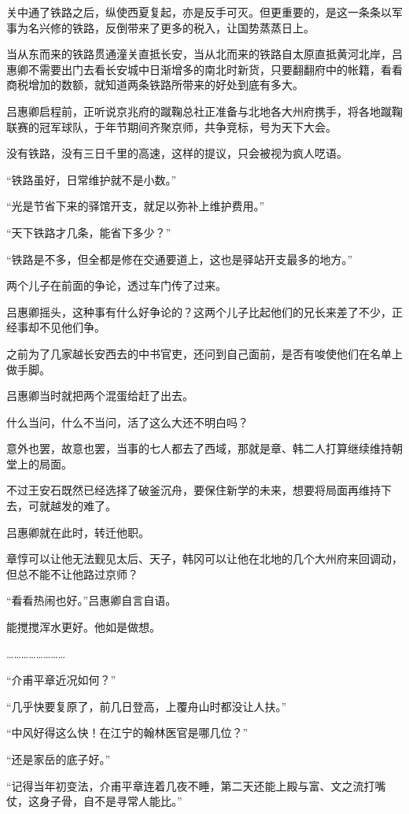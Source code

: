 关中通了铁路之后，纵使西夏复起，亦是反手可灭。但更重要的，是这一条条以军事为名兴修的铁路，反倒带来了更多的税入，让国势蒸蒸日上。

当从东而来的铁路贯通潼关直抵长安，当从北而来的铁路自太原直抵黄河北岸，吕惠卿不需要出门去看长安城中日渐增多的南北时新货，只要翻翻府中的帐籍，看看商税增加的数额，就知道两条铁路所带来的好处到底有多大。

吕惠卿启程前，正听说京兆府的蹴鞠总社正准备与北地各大州府携手，将各地蹴鞠联赛的冠军球队，于年节期间齐聚京师，共争竞标，号为天下大会。

没有铁路，没有三日千里的高速，这样的提议，只会被视为疯人呓语。

“铁路虽好，日常维护就不是小数。”

“光是节省下来的驿馆开支，就足以弥补上维护费用。”

“天下铁路才几条，能省下多少？”

“铁路是不多，但全都是修在交通要道上，这也是驿站开支最多的地方。”

两个儿子在前面的争论，透过车门传了过来。

吕惠卿摇头，这种事有什么好争论的？这两个儿子比起他们的兄长来差了不少，正经事却不见他们争。

之前为了几家越长安西去的中书官吏，还问到自己面前，是否有唆使他们在名单上做手脚。

吕惠卿当时就把两个混蛋给赶了出去。

什么当问，什么不当问，活了这么大还不明白吗？

意外也罢，故意也罢，当事的七人都去了西域，那就是章、韩二人打算继续维持朝堂上的局面。

不过王安石既然已经选择了破釜沉舟，要保住新学的未来，想要将局面再维持下去，可就越发的难了。

吕惠卿就在此时，转迁他职。

章惇可以让他无法觐见太后、天子，韩冈可以让他在北地的几个大州府来回调动，但总不能不让他路过京师？

“看看热闹也好。”吕惠卿自言自语。

能搅搅浑水更好。他如是做想。

……………………

“介甫平章近况如何？”

“几乎快要复原了，前几日登高，上覆舟山时都没让人扶。”

“中风好得这么快！在江宁的翰林医官是哪几位？”

“还是家岳的底子好。”

“记得当年初变法，介甫平章连着几夜不睡，第二天还能上殿与富、文之流打嘴仗，这身子骨，自不是寻常人能比。”

